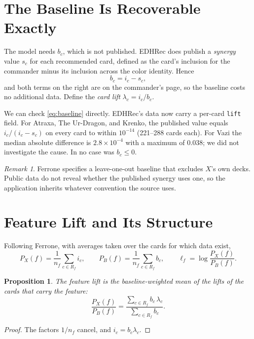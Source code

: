\documentclass[11pt]{article}
\newtheorem{proposition}{Proposition}
\theoremstyle{remark}
\newtheorem{remark}{Remark}
\begin{document}
\section{The Baseline Is Recoverable Exactly}\label{sec:baseline}
\noindent The model needs $b_c$, which is not published. EDHRec does publish a
\emph{synergy} value $s_c$ for each recommended card, defined as the card's
inclusion for the commander minus its inclusion across the color identity. Hence
\begin{equation}\label{eq:baseline}
  b_c = i_c - s_c ,
\end{equation}
and both terms on the right are on the commander's page, so the baseline costs no
additional data. Define the \emph{card lift} $\lambda_c = i_c/b_c$.

We can check \eqref{eq:baseline} directly. EDHRec's data now carry a per-card
\texttt{lift} field. For Atraxa, The Ur-Dragon, and Krenko, the published value
equals $i_c/(i_c-s_c)$ on every card to within $10^{-14}$ (221--288 cards each).
For Vazi the median absolute difference is $2.8\times10^{-4}$ with a maximum of
$0.038$; we did not investigate the cause. In no case was $b_c\le 0$.

\begin{remark}
Ferrone specifies a leave-one-out baseline that excludes $X$'s own decks.
Public data do not reveal whether the published synergy uses one, so the
application inherits whatever convention the source uses.
\end{remark}

\section{Feature Lift and Its Structure}\label{sec:lift}
\noindent Following Ferrone, with averages taken over the cards for which data
exist,
\begin{equation}\label{eq:px}
  P_X(f)=\frac{1}{n_f}\sum_{c\in R_f} i_c,\qquad
  P_B(f)=\frac{1}{n_f}\sum_{c\in R_f} b_c,\qquad
  \ell_f=\log\frac{P_X(f)}{P_B(f)} .
\end{equation}

\begin{proposition}\label{prop:weighted}
The feature lift is the baseline-weighted mean of the lifts of the cards that
carry the feature:
\[
  \frac{P_X(f)}{P_B(f)}=\frac{\sum_{c\in R_f} b_c\,\lambda_c}{\sum_{c\in R_f} b_c}.
\]
\end{proposition}
\begin{proof}
The factors $1/n_f$ cancel, and $i_c=b_c\lambda_c$.
\end{proof}
\end{document}
